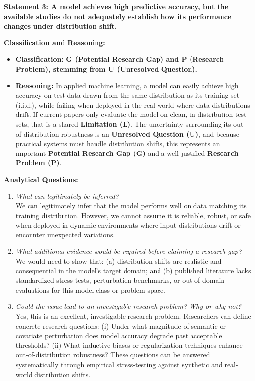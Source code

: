 \documentclass[11pt]{article}
\newcommand{\qLabel}[1]{
    {\fontsize{12}{14.4}\selectfont \textbf{#1}}
}
\begin{document}
\vspace{1.2em}



\newpage
\qLabel{Statement 3: A model achieves high predictive accuracy, but the available studies do not adequately establish how its performance changes under distribution shift.}
\vspace{0.4em}

\noindent\textbf{Classification and Reasoning:}
\begin{itemize}[leftmargin=1.5em]
    \item \textbf{Classification: G (Potential Research Gap) and P (Research Problem), stemming from U (Unresolved Question).}
    \item \textbf{Reasoning:} In applied machine learning, a model can easily achieve high accuracy on test data drawn from the same distribution as its training set (i.i.d.), while failing when deployed in the real world where data distributions drift. If current papers only evaluate the model on clean, in-distribution test sets, that is a shared \textbf{Limitation (L)}. The uncertainty surrounding its out-of-distribution robustness is an \textbf{Unresolved Question (U)}, and because practical systems must handle distribution shifts, this represents an important \textbf{Potential Research Gap (G)} and a well-justified \textbf{Research Problem (P)}.
\end{itemize}

\noindent\textbf{Analytical Questions:}
\begin{enumerate}[leftmargin=1.5em]
    \item \textit{What can legitimately be inferred?} \\
    We can legitimately infer that the model performs well on data matching its training distribution. However, we cannot assume it is reliable, robust, or safe when deployed in dynamic environments where input distributions drift or encounter unexpected variations.
    \item \textit{What additional evidence would be required before claiming a research gap?} \\
    We would need to show that: (a) distribution shifts are realistic and consequential in the model's target domain; and (b) published literature lacks standardized stress tests, perturbation benchmarks, or out-of-domain evaluations for this model class or problem space.
    \item \textit{Could the issue lead to an investigable research problem? Why or why not?} \\
    Yes, this is an excellent, investigable research problem. Researchers can define concrete research questions: (i) Under what magnitude of semantic or covariate perturbation does model accuracy degrade past acceptable thresholds? (ii) What inductive biases or regularization techniques enhance out-of-distribution robustness? These questions can be answered systematically through empirical stress-testing against synthetic and real-world distribution shifts.
\end{enumerate}
\end{document}
